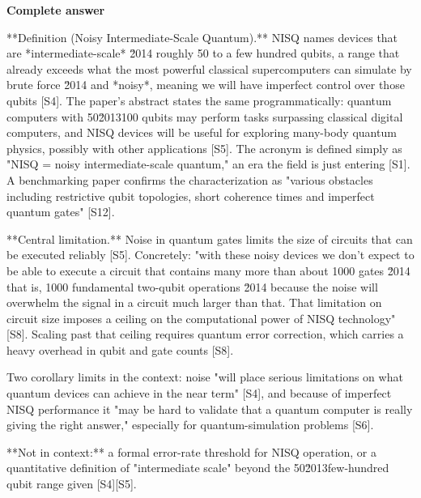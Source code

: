 \documentclass[10pt]{article}
\begin{document}
\textbf{Complete answer}
\begin{AnswerText}
**Definition (Noisy Intermediate-Scale Quantum).** NISQ names devices that are *intermediate-scale* \u2014 roughly 50 to a few hundred qubits, a range that already exceeds what the most powerful classical supercomputers can simulate by brute force \u2014 and *noisy*, meaning we will have imperfect control over those qubits [S4]. The paper's abstract states the same programmatically: quantum computers with 50\u2013100 qubits may perform tasks surpassing classical digital computers, and NISQ devices will be useful for exploring many-body quantum physics, possibly with other applications [S5]. The acronym is defined simply as "NISQ = noisy intermediate-scale quantum," an era the field is just entering [S1]. A benchmarking paper confirms the characterization as "various obstacles including restrictive qubit topologies, short coherence times and imperfect quantum gates" [S12].

**Central limitation.** Noise in quantum gates limits the size of circuits that can be executed reliably [S5]. Concretely: "with these noisy devices we don't expect to be able to execute a circuit that contains many more than about 1000 gates \u2014 that is, 1000 fundamental two-qubit operations \u2014 because the noise will overwhelm the signal in a circuit much larger than that. That limitation on circuit size imposes a ceiling on the computational power of NISQ technology" [S8]. Scaling past that ceiling requires quantum error correction, which carries a heavy overhead in qubit and gate counts [S8].

Two corollary limits in the context: noise "will place serious limitations on what quantum devices can achieve in the near term" [S4], and because of imperfect NISQ performance it "may be hard to validate that a quantum computer is really giving the right answer," especially for quantum-simulation problems [S6].

**Not in context:** a formal error-rate threshold for NISQ operation, or a quantitative definition of "intermediate scale" beyond the 50\u2013few-hundred qubit range given [S4][S5].
\end{AnswerText}
\end{document}

